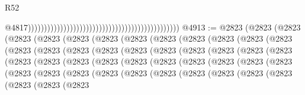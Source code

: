 \begin{lexlean}{R52}
\begin{coremodule}
                                                                                                  @4817)))))))))))))))))))))))))))))))))))))))))))))))
@4913 := @2823
    (@2823
      (@2823
        (@2823
          (@2823
            (@2823
              (@2823
                (@2823
                  (@2823
                    (@2823
                      (@2823
                        (@2823
                          (@2823
                            (@2823
                              (@2823
                                (@2823
                                  (@2823
                                    (@2823
                                      (@2823
                                        (@2823
                                          (@2823
                                            (@2823
                                              (@2823
                                                (@2823
                                                  (@2823
                                                    (@2823
                                                      (@2823
                                                        (@2823
                                                          (@2823
                                                            (@2823
                                                              (@2823
                                                                (@2823
                                                                  (@2823
                                                                    (@2823
                                                                      (@2823
                                                                        (@2823
                                                                          (@2823
                                                                            (@2823
                                                                              (@2823
                                                                                (@2823
                                                                                  (@2823
                                                                                    (@2823
                                                                                      (@2823
                                                                                        (@2823
                                                                                          (@2823
                                                                                            (@2823

\end{coremodule}
\end{lexlean}
